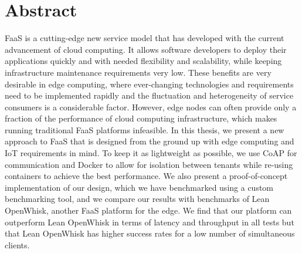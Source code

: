 \documentclass[a4paper, 11pt]{article}
\begin{document}

\clearpage
\pagestyle{plain}

\newpage
\section*{Abstract}

FaaS is a cutting-edge new service model that has developed with the current advancement of cloud computing.
It allows software developers to deploy their applications quickly and with needed flexibility and scalability, while keeping infrastructure maintenance requirements very low.
These benefits are very desirable in edge computing, where ever-changing technologies and requirements need to be implemented rapidly and the fluctuation and heterogeneity of service consumers is a considerable factor.
However, edge nodes can often provide only a fraction of the performance of cloud computing infrastructure, which makes running traditional FaaS platforms infeasible.
In this thesis, we present a new approach to FaaS that is designed from the ground up with edge computing and IoT requirements in mind.
To keep it as lightweight as possible, we use CoAP for communication and Docker to allow for isolation between tenants while re-using containers to achieve the best performance.
We also present a proof-of-concept implementation of our design, which we have benchmarked using a custom benchmarking tool, and we compare our results with benchmarks of Lean OpenWhisk, another FaaS platform for the edge.
We find that our platform can outperform Lean OpenWhisk in terms of latency and throughput in all tests but that Lean OpenWhisk has higher success rates for a low number of simultaneous clients.
\end{document}
